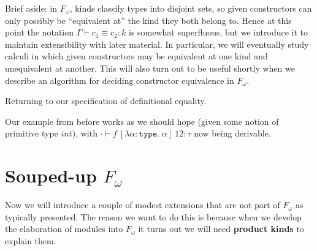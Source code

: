 \documentclass{amsart}
\newcommand{\type}{\ensuremath{\mathtt{type}}}
\begin{document}
Brief aside: in $F_\omega$, kinds classify types into disjoint sets, so given constructors can only possibly be ``equivalent at'' the kind they both belong to. Hence at this point the notation $\Gamma \vdash c_1 \equiv c_2 : k$ is somewhat superfluous, but we introduce it to maintain extensibility with later material. In particular, we will eventually study calculi in which given constructors may be equivalent at one kind and unequivalent at another. This will also turn out to be useful shortly when we describe an algorithm for deciding constructor equivalence in $F_\omega$.

Returning to our specification of definitional equality.


Our example from before works as we should hope (given some notion of primitive type $int$), with $\cdot \vdash f \ [\lambda \alpha : \type. \; \alpha] \ 12 : \tau$ now being derivable.

\section{Souped-up $F_\omega$}
Now we will introduce a couple of modest extensions that are not part of $F_\omega$ as typically presented. The reason we want to do this is because when we develop the elaboration of modules into $F_\omega$ it turns out we will need {\bf product kinds} to explain them.
\end{document}
